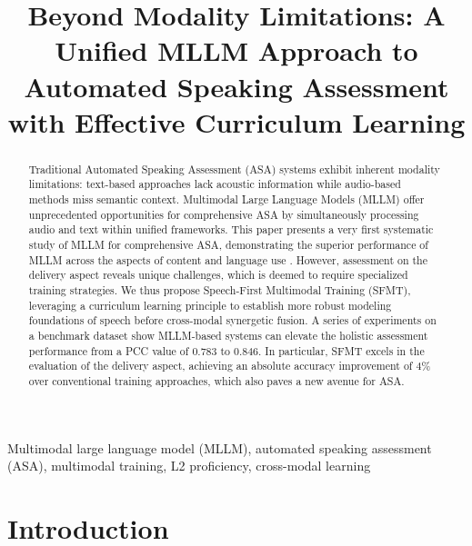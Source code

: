 \documentclass[conference]{IEEEtran}
\begin{document}
\title{Beyond Modality Limitations: A Unified MLLM Approach to Automated Speaking Assessment with Effective Curriculum Learning}

\author{
}

\maketitle

\begin{abstract}
Traditional Automated Speaking Assessment (ASA) systems exhibit inherent modality limitations: text-based approaches lack acoustic information while audio-based methods miss semantic context. Multimodal Large Language Models (MLLM) offer unprecedented opportunities for comprehensive ASA by simultaneously processing audio and text within unified frameworks. This paper presents a very first systematic study of MLLM for comprehensive ASA, demonstrating the superior performance of MLLM across the aspects of content and language use . However,  assessment on the delivery aspect reveals unique challenges, which is deemed to require specialized training strategies. We thus propose Speech-First Multimodal Training (SFMT), leveraging a curriculum learning principle to establish more robust modeling foundations of speech before cross-modal synergetic fusion. A series of experiments on a benchmark dataset show MLLM-based systems can elevate the holistic assessment performance from a PCC value of 0.783 to 0.846. In particular, SFMT excels in the evaluation of the delivery aspect, achieving an absolute accuracy improvement of 4\% over conventional training approaches, which also paves a new avenue for ASA.
\end{abstract}

\begin{IEEEkeywords}
Multimodal large language model (MLLM), automated speaking assessment (ASA), multimodal training, L2 proficiency, cross-modal learning
\end{IEEEkeywords}

\section{Introduction}
\end{document}
